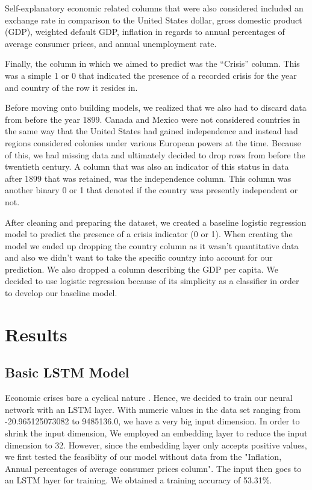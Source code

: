 \documentclass[12pt]{article}
\begin{document}
Self-explanatory economic related columns that were also considered included an exchange rate in comparison to the United States dollar, gross domestic product (GDP), weighted default GDP, inflation in regards to annual percentages of average consumer prices, and annual unemployment rate. 

Finally, the column in which we aimed to predict was the “Crisis” column. This was a simple 1 or 0 that indicated the presence of a recorded crisis for the year and country of the row it resides in.

Before moving onto building models, we realized that we also had to discard data from before the year 1899. Canada and Mexico were not considered countries in the same way that the United States had gained independence and instead had regions considered colonies under various European powers at the time. Because of this, we had missing data and ultimately decided to drop rows from before the twentieth century. A column that was also an indicator of this status in data after 1899 that was retained, was the independence column. This column was another binary 0 or 1 that denoted if the country was presently independent or not.

After cleaning and preparing the dataset, we created a baseline logistic regression model to predict the presence of a crisis indicator (0 or 1). When creating the model we ended up dropping the country column as it wasn’t quantitative data and also we didn’t want to take the specific country into account for our prediction. We also dropped a column describing the GDP per capita. We decided to use logistic regression because of its simplicity as a classifier in order to develop our baseline model.



\section{Results}
\subsection{Basic LSTM Model}
Economic crises bare a cyclical nature \cite{10.1007/978-3-030-15577-3_11}. Hence, we decided to train our neural network with an LSTM layer. With numeric values in the data set ranging from -20.965125073082 to 9485136.0, we have a very big input dimension. In order to shrink the input dimension, We employed an embedding layer to reduce the input dimension to 32. However, since the embedding layer only accepts positive values, we first tested the feasiblity of our model without data from the "Inflation, Annual percentages of average consumer prices column". The input then goes to an LSTM layer for training. We obtained a training accuracy of 53.31\%.
\end{document}

